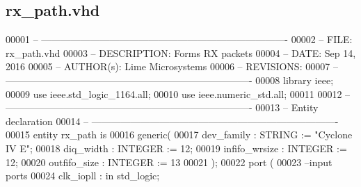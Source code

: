 \subsection{rx\+\_\+path.\+vhd}
\label{rx__path_8vhd_source}

\begin{DoxyCode}
00001 \textcolor{keyword}{-- ---------------------------------------------------------------------------- }
00002 \textcolor{keyword}{-- FILE:    rx\_path.vhd}
00003 \textcolor{keyword}{-- DESCRIPTION: Forms RX packets}
00004 \textcolor{keyword}{-- DATE:    Sep 14, 2016}
00005 \textcolor{keyword}{-- AUTHOR(s):   Lime Microsystems}
00006 \textcolor{keyword}{-- REVISIONS:}
00007 \textcolor{keyword}{-- ---------------------------------------------------------------------------- }
00008 \textcolor{vhdlkeyword}{library }\textcolor{keywordflow}{ieee};
00009 \textcolor{vhdlkeyword}{use }ieee.std\_logic\_1164.\textcolor{keywordflow}{all};
00010 \textcolor{vhdlkeyword}{use }ieee.numeric\_std.\textcolor{keywordflow}{all};
00011 
00012 \textcolor{keyword}{-- ----------------------------------------------------------------------------}
00013 \textcolor{keyword}{-- Entity declaration}
00014 \textcolor{keyword}{-- ----------------------------------------------------------------------------}
00015 \textcolor{keywordflow}{entity }rx_path \textcolor{keywordflow}{is}
00016 \textcolor{keywordflow}{generic}\textcolor{vhdlchar}{(}
00017         \textcolor{vhdlchar}{dev_family}      \textcolor{vhdlchar}{:} \textcolor{comment}{STRING} \textcolor{vhdlchar}{:=} \textcolor{keyword}{"Cyclone IV E"};
00018         \textcolor{vhdlchar}{diq_width}       \textcolor{vhdlchar}{:} \textcolor{comment}{INTEGER} \textcolor{vhdlchar}{:=} \textcolor{vhdllogic}{}\textcolor{vhdllogic}{12};
00019         \textcolor{vhdlchar}{infifo_wrsize}   \textcolor{vhdlchar}{:} \textcolor{comment}{INTEGER} \textcolor{vhdlchar}{:=} \textcolor{vhdllogic}{}\textcolor{vhdllogic}{12};
00020         \textcolor{vhdlchar}{outfifo_size}    \textcolor{vhdlchar}{:} \textcolor{comment}{INTEGER} \textcolor{vhdlchar}{:=} \textcolor{vhdllogic}{}\textcolor{vhdllogic}{13}
00021         \textcolor{vhdlchar}{)};
00022   \textcolor{keywordflow}{port} \textcolor{vhdlchar}{(}
00023 \textcolor{keyword}{      --input ports}
00024         \textcolor{vhdlchar}{clk_iopll}           \textcolor{vhdlchar}{:} \textcolor{keywordflow}{in} \textcolor{comment}{std\_logic};

\end{DoxyCode}

